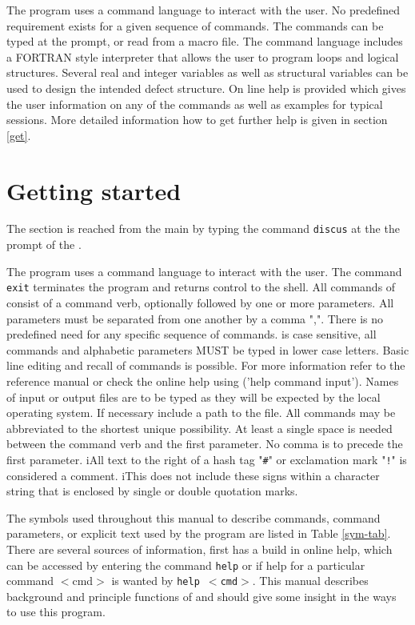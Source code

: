 The program uses a command language to interact with the user. No
predefined requirement exists for a given sequence of commands. The
commands can be typed at the \Discus prompt, or read from a
macro file. The command language includes a FORTRAN style
interpreter that allows the user to program loops and logical
structures. Several real and integer variables as well as structural
variables can be used to design the intended defect structure. On
line help is provided which gives the user information on any of the
\Discus commands as well as examples for typical \Discus
sessions. More detailed information how to get further help is given
in section \ref{get}.


\section{Getting started \label{get}}

The \Discus section is reached from the main \Suite by typing the command
{\tt discus} at the the  prompt of the \suite.

The program uses a command language to interact with the user.  The
command {\tt exit} terminates the program and returns control to the
shell.  All commands of \Discus consist of a command verb,
optionally followed by one or more parameters.  All parameters must
be separated from one another by a comma ",".  There is no
predefined need for any specific sequence of commands.  \Discus
is case sensitive, all commands and alphabetic parameters MUST be
typed in lower case letters.   Basic 
line editing and recall of commands is possible.  For more
information refer to the reference manual or check the online help
using ('help command input').  Names of input or output files are to
be typed as they will be expected by the local operating system.  
If necessary
include a path to the file.  All commands may be abbreviated to the
shortest unique possibility. At least a single space is needed
between the command verb and the first parameter.  No comma is to
precede the first parameter. iAll text to the right of a 
hash tag "{\tt \#}" or exclamation mark "{\tt !}" is considered a
comment. iThis does not include these signs within a character string
that is enclosed by single or double quotation marks.  \par

The symbols used throughout this manual to describe commands,
command parameters, or explicit text used by the program \Discus 
are listed in Table \ref{sym-tab}. There are several sources
of information, first \Discus has a build in online help, which
can be accessed by entering the command {\tt help} or if help for a
particular command $<$cmd$>$ is wanted by {\tt help $<$cmd$>$}. This
manual describes background and principle functions of \Discus
and should give some insight in the ways to use this program. \par

